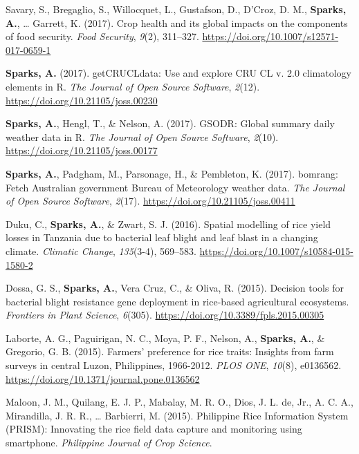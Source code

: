 \documentclass[11pt, a4paper]{awesome-cv}
\begin{document}
\leavevmode{}%
Savary, S., Bregaglio, S., Willocquet, L., Gustafson, D., D'Croz, D. M.,
\textbf{Sparks, A.}, \ldots{} Garrett, K. (2017). Crop health and its
global impacts on the components of food security. \emph{Food Security},
\emph{9}(2), 311--327. \url{https://doi.org/10.1007/s12571-017-0659-1}

\leavevmode{}%
\textbf{Sparks, A.} (2017). {getCRUCLdata}: {Use} and explore {CRU CL}
v. 2.0 climatology elements in {R}. \emph{The Journal of Open Source
Software}, \emph{2}(12). \url{https://doi.org/10.21105/joss.00230}

\leavevmode{}%
\textbf{Sparks, A.}, Hengl, T., \& Nelson, A. (2017). {GSODR}: {Global}
summary daily weather data in {R}. \emph{The Journal of Open Source
Software}, \emph{2}(10). \url{https://doi.org/10.21105/joss.00177}

\leavevmode{}%
\textbf{Sparks, A.}, Padgham, M., Parsonage, H., \& Pembleton, K.
(2017). {bomrang}: {Fetch Australian} government {Bureau of Meteorology}
weather data. \emph{The Journal of Open Source Software}, \emph{2}(17).
\url{https://doi.org/10.21105/joss.00411}

\leavevmode{}%
Duku, C., \textbf{Sparks, A.}, \& Zwart, S. J. (2016). Spatial modelling
of rice yield losses in {Tanzania} due to bacterial leaf blight and leaf
blast in a changing climate. \emph{Climatic Change}, \emph{135}(3-4),
569--583. \url{https://doi.org/10.1007/s10584-015-1580-2}

\leavevmode{}%
Dossa, G. S., \textbf{Sparks, A.}, Vera Cruz, C., \& Oliva, R. (2015).
Decision tools for bacterial blight resistance gene deployment in
rice-based agricultural ecosystems. \emph{Frontiers in Plant Science},
\emph{6}(305). \url{https://doi.org/10.3389/fpls.2015.00305}

\leavevmode{}%
Laborte, A. G., Paguirigan, N. C., Moya, P. F., Nelson, A.,
\textbf{Sparks, A.}, \& Gregorio, G. B. (2015). Farmers' preference for
rice traits: {Insights} from farm surveys in central {Luzon,
Philippines}, 1966-2012. \emph{PLOS ONE}, \emph{10}(8), e0136562.
\url{https://doi.org/10.1371/journal.pone.0136562}

\leavevmode{}%
Maloon, J. M., Quilang, E. J. P., Mabalay, M. R. O., Dios, J. L. de,
Jr., A. C. A., Mirandilla, J. R. R., \ldots{} Barbierri, M. (2015).
{Philippine Rice Information System (PRISM)}: Innovating the rice field
data capture and monitoring using smartphone. \emph{Philippine Journal
of Crop Science}.
\end{document}
